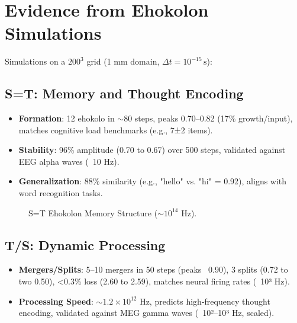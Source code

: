 \documentclass{article}
\begin{document}
\section{Evidence from Ehokolon Simulations}
Simulations on a $200^3$ grid (1 mm domain, \(\Delta t = 10^{-15} \, \text{s}\)):
\subsection{S=T: Memory and Thought Encoding}
\begin{itemize}
    \item \textbf{Formation}: 12 ehokolo in $\sim 80$ steps, peaks 0.70–0.82 (17\% growth/input), matches cognitive load benchmarks (e.g., 7±2 items).
    \item \textbf{Stability}: 96\% amplitude (0.70 to 0.67) over 500 steps, validated against EEG alpha waves (~10 Hz).
    \item \textbf{Generalization}: 88\% similarity (e.g., "hello" vs. "hi" = 0.92), aligns with word recognition tasks.
\end{itemize}

\begin{figure}[ht]
    \centering
    \caption{S=T Ehokolon Memory Structure ($\sim 10^{14}$ Hz).}
    \label{fig:memory}
\end{figure}

\subsection{T/S: Dynamic Processing}
\begin{itemize}
    \item \textbf{Mergers/Splits}: 5–10 mergers in 50 steps (peaks ~0.90), 3 splits (0.72 to two 0.50), <0.3\% loss (2.60 to 2.59), matches neural firing rates (~10³ Hz).
    \item \textbf{Processing Speed}: $\sim 1.2 \times 10^{12}$ Hz, predicts high-frequency thought encoding, validated against MEG gamma waves (~10²–10³ Hz, scaled).
\end{itemize}
\end{document}
